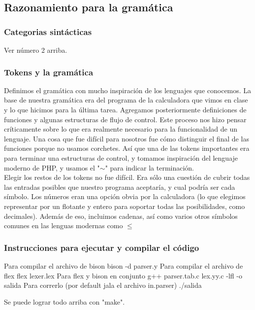 \documentclass[12pt]{article}
\begin{document}
\subsection*{Razonamiento para la gramática}
\subsubsection*{Categorias sintácticas}
Ver número 2 arriba.
\subsubsection*{Tokens y la gramática}
Definimos el gramática con mucho inspiración de los lenguajes que conocemos. La base de nuestra gramática era del programa de la calculadora que vimos en clase y lo que hicimos para la última tarea. Agregamos posteriormente definiciones de funciones y algunas estructuras de flujo de control. Este proceso nos hizo pensar críticamente sobre lo que era realmente necesario para la funcionalidad de un lenguaje. Una cosa que fue difícil para nosotros fue cómo distinguir el final de las funciones porque no usamos corchetes. Así que una de las tokens importantes era para terminar una estructuras de control, y tomamos inspiración del lenguaje moderno de PHP, y usamos el "$\sim$" para indicar la terminación. \\

Elegir los restos de los tokens no fue difícil. Era sólo una cuestión de cubrir todas las entradas posibles que nuestro programa aceptaría, y cual podría ser cada símbolo. Los números eran una opción obvia por la calculadora (lo que elegimos representar por un flotante y entero para soportar todas las posibilidades, como decimales). Además de eso, incluimos cadenas, así como varios otros símbolos comunes en las lenguas modernas como $\leq$

\subsubsection*{Instrucciones para ejecutar y compilar el código}
\begin{outline}
 \1  Para compilar el archivo de bison
   \2 bison -d parser.y
 \1 Para compilar el archivo de flex
    \2 flex lexer.lex
 \1 Para flex y bison en conjunto
    \2 g++ parser.tab.c lex.yy.c -lfl -o salida
 \1 Para correrlo (por default jala el archivo in.parser)
    \2 ./salida
\end{outline}
Se puede lograr todo arriba con "make".
\end{document}
